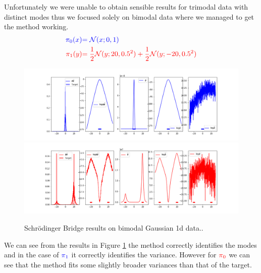 \documentclass[a4paper,12pt,twoside,openright]{report}
\theoremstyle{definition}
\begin{document}
Unfortunately we were unable to obtain sensible results for trimodal data with distinct modes thus we focused solely on bimodal data where we managed to get the method working.
\begin{align*}
     \color{blue}{\pi_0(x)} &\color{blue}{= {\mathcal{N}}(x; 0,  1)} \\
    \color{red}{\pi_1(y)} &\color{red}{= \frac{1}{2}{\mathcal{N}}(y; 20, 0.5 ^2) + \frac{1}{2}{\mathcal{N}}(y; -20, 0.5 ^2)} 
\end{align*}
\begin{figure}[t]
    \centering
     \includegraphics[scale=0.45,trim={2.3cm 0.2cm 1.5cm 0}, clip]{images/Pavon/Forward_bimodal_test_working.png} \\ \vspace{-0.2cm}
    \includegraphics[scale=0.45,trim={2.3cm 0 1.5cm 1.5cm}, clip]{images/Pavon/Backward_bimodal_test_working.png} 
    \caption{Schrödinger Bridge results on bimodal Gaussian 1d data.. }
    \label{fig:pavon_bimodal}
\end{figure}
We can see from the results in  Figure \ref{fig:pavon_bimodal} the method correctly identifies the modes and in the case of $\color{blue}{\pi_1}$ it correctly identifies the variance. However for $\color{red}{\pi_0}$ we can see that the method fits some slightly broader variances than that of the target. 
\end{document}

